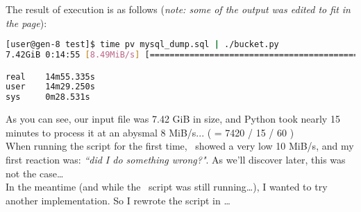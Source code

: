 The result of execution is as follows (\emph{note: some of the output was edited to fit in the page}):

\begin{lstlisting}[language=sh]
[user@gen-8 test]$ time pv mysql_dump.sql | ./bucket.py
7.42GiB 0:14:55 [8.49MiB/s] [====================================================>] 100%  

real    14m55.335s
user    14m29.250s
sys     0m28.531s
\end{lstlisting}

As you can see, our input file was 7.42 GiB in size, and Python took nearly 15 minutes to process it at an abysmal 8 MiB/s... ( = 7420 / 15 / 60 ) \\

When running the script for the first time, \pv\ showed a very low 10 MiB/s, and my first reaction was: \emph{``did I do something wrong?"}.
As we'll discover later, this was not the case\dots \\

In the meantime (and while the \python\ script was still running\dots), I wanted to try another implementation. So I rewrote the script in \awk\dots
